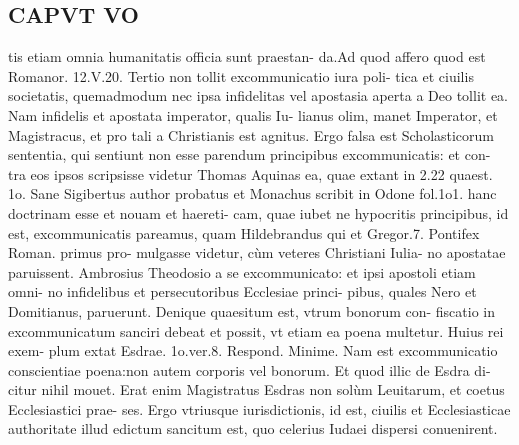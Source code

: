 \documentclass{article}
\begin{document}
\begin{pages}
\section*{CAPVT VO }
\marginpar{[ p.40 ]}\pstart tis etiam omnia humanitatis officia sunt praestan- da.Ad quod affero quod est Romanor. 12.V.20.  \pend\pstart Tertio non tollit excommunicatio iura poli- tica et ciuilis societatis, quemadmodum nec ipsa infidelitas vel apostasia aperta a Deo tollit ea. Nam infidelis et apostata imperator, qualis Iu- lianus olim, manet Imperator, et Magistracus, et pro tali a Christianis est agnitus. Ergo falsa est Scholasticorum sententia, qui sentiunt non esse parendum principibus excommunicatis: et con- tra eos ipsos scripsisse videtur Thomas Aquinas ea, quae extant in 2.22 quaest. 1o. Sane Sigibertus author probatus et Monachus scribit in Odone fol.1o1. hanc doctrinam esse et nouam et haereti- cam, quae iubet ne hypocritis principibus, id est, excommunicatis pareamus, quam Hildebrandus qui et Gregor.7. Pontifex Roman. primus pro- mulgasse videtur, cùm veteres Christiani Iulia- no apostatae paruissent. Ambrosius Theodosio a se excommunicato: et ipsi apostoli etiam omni- no infidelibus et persecutoribus Ecclesiae princi- pibus, quales Nero et Domitianus, paruerunt.  \pend\pstart Denique quaesitum est, vtrum bonorum con- fiscatio in excommunicatum sanciri debeat et possit, vt etiam ea poena multetur. Huius rei exem- plum extat Esdrae. 1o.ver.8. Respond. Minime. Nam est excommunicatio conscientiae poena:non autem corporis vel bonorum. Et quod illic de Esdra di- citur nihil mouet. Erat enim Magistratus Esdras non solùm Leuitarum, et coetus Ecclesiastici prae- ses. Ergo vtriusque iurisdictionis, id est, ciuilis et Ecclesiasticae authoritate illud edictum sancitum est, quo celerius Iudaei dispersi conuenirent.  \pend

\end{pages}
\end{document}
